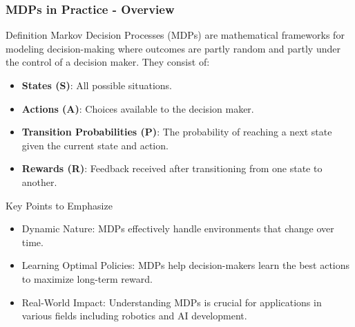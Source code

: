 \documentclass[aspectratio=169]{beamer}
\begin{document}
\begin{frame}[fragile]
    \frametitle{MDPs in Practice - Overview}
    \begin{block}{Definition}
        Markov Decision Processes (MDPs) are mathematical frameworks for modeling decision-making where outcomes are partly random and partly under the control of a decision maker. They consist of:
        \begin{itemize}
            \item \textbf{States (S)}: All possible situations.
            \item \textbf{Actions (A)}: Choices available to the decision maker.
            \item \textbf{Transition Probabilities (P)}: The probability of reaching a next state given the current state and action.
            \item \textbf{Rewards (R)}: Feedback received after transitioning from one state to another.
        \end{itemize}
    \end{block}
    
    \begin{block}{Key Points to Emphasize}
        \begin{itemize}
            \item Dynamic Nature: MDPs effectively handle environments that change over time.
            \item Learning Optimal Policies: MDPs help decision-makers learn the best actions to maximize long-term reward.
            \item Real-World Impact: Understanding MDPs is crucial for applications in various fields including robotics and AI development.
        \end{itemize}
    \end{block}
\end{frame}
\end{document}
